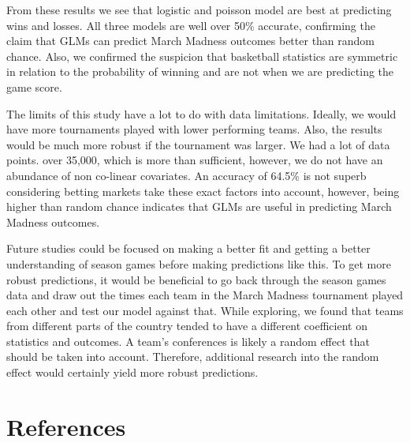\documentclass[
  man,floatsintext]{apa6}
\begin{document}
From these results we see that logistic and poisson model are best at predicting wins and losses. All three models are well over 50\% accurate, confirming the claim that GLMs can predict March Madness outcomes better than random chance. Also, we confirmed the suspicion that basketball statistics are symmetric in relation to the probability of winning and are not when we are predicting the game score.

The limits of this study have a lot to do with data limitations. Ideally, we would have more tournaments played with lower performing teams. Also, the results would be much more robust if the tournament was larger. We had a lot of data points. over 35,000, which is more than sufficient, however, we do not have an abundance of non co-linear covariates. An accuracy of 64.5\% is not superb considering betting markets take these exact factors into account, however, being higher than random chance indicates that GLMs are useful in predicting March Madness outcomes.

Future studies could be focused on making a better fit and getting a better understanding of season games before making predictions like this. To get more robust predictions, it would be beneficial to go back through the season games data and draw out the times each team in the March Madness tournament played each other and test our model against that. While exploring, we found that teams from different parts of the country tended to have a different coefficient on statistics and outcomes. A team's conferences is likely a random effect that should be taken into account. Therefore, additional research into the random effect would certainly yield more robust predictions.

\newpage

\hypertarget{references}{%
\section{References}\label{references}}

\begingroup
\setlength{\parindent}{-0.5in}
\setlength{\leftskip}{0.0in}
\end{document}

